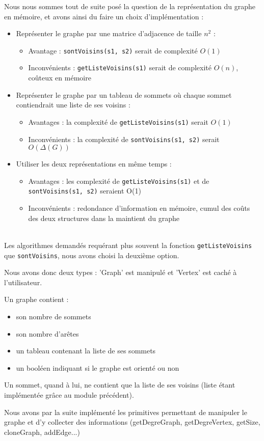 \documentclass[a4paper,10pt]{article}
\newcommand*{\itemb}{\item[$\bullet$]}
\begin{document}
Nous nous sommes tout de suite posé la question de la représentation du graphe en mémoire, et avons ainsi du faire un choix d'implémentation :
\begin{itemize}
	\itemb Représenter le graphe par une matrice d'adjacence de taille $n^2$ :
	\begin{itemize}
		\item Avantage : \texttt{sontVoisins(s1, s2)} serait de complexité $O(1)$
		\item Inconvénients : \texttt{getListeVoisins(s1)} serait de complexité $O(n)$, coûteux en mémoire
	\end{itemize}
\itemb Représenter le graphe par un tableau de sommets où chaque sommet contiendrait une liste de ses voisins :
	\begin{itemize}
		\item Avantages : la complexité de \texttt{getListeVoisins(s1)} serait $O(1)$
	\item Inconvénients : la complexité de \texttt{sontVoisins(s1, s2)} serait $O(\Delta(G))$
	\end{itemize}
\itemb Utiliser les deux représentations en même temps :
	\begin{itemize}
		\item Avantages : les complexité de \texttt{getListeVoisins(s1)} et de \texttt{sontVoisins(s1, s2)} seraient O(1)
		\item Inconvénients : redondance d'information en mémoire, cumul des coûts des deux structures dans la maintient du graphe
	\end{itemize}
\end{itemize}
~~\\
Les algorithmes demandés requérant plus souvent la fonction \texttt{getListeVoisins} que \texttt{sontVoisins}, nous avons choisi la deuxième option.

Nous avons donc deux types : 'Graph' est manipulé et 'Vertex' est caché à l'utilisateur.

Un graphe contient :
\begin{itemize}
\itemb son nombre de sommets
\itemb son nombre d'arêtes
\itemb un tableau contenant la liste de ses sommets
\itemb un booléen indiquant si le graphe est orienté ou non
\end{itemize}

Un sommet, quand à lui, ne contient que la liste de ses voisins (liste étant implémentée grâce au module précédent).

Nous avons par la suite implémenté les primitives permettant de manipuler le graphe et d'y collecter des informations (getDegreGraph, getDegreVertex, getSize, cloneGraph, addEdge...)
\end{document}
